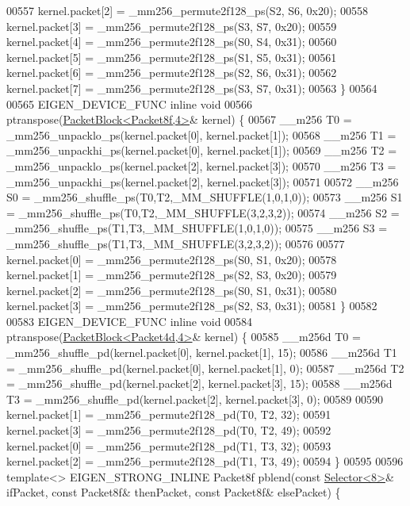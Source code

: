 \begin{DoxyCode}
{{00557   kernel.packet[2] = \_mm256\_permute2f128\_ps(S2, S6, 0x20);
00558   kernel.packet[3] = \_mm256\_permute2f128\_ps(S3, S7, 0x20);
00559   kernel.packet[4] = \_mm256\_permute2f128\_ps(S0, S4, 0x31);
00560   kernel.packet[5] = \_mm256\_permute2f128\_ps(S1, S5, 0x31);
00561   kernel.packet[6] = \_mm256\_permute2f128\_ps(S2, S6, 0x31);
00562   kernel.packet[7] = \_mm256\_permute2f128\_ps(S3, S7, 0x31);
00563 \}
00564 
00565 EIGEN\_DEVICE\_FUNC \textcolor{keyword}{inline} \textcolor{keywordtype}{void}
00566 ptranspose(\hyperlink{struct_eigen_1_1internal_1_1_packet_block}{PacketBlock<Packet8f,4>}& kernel) \{
00567   \_\_m256 T0 = \_mm256\_unpacklo\_ps(kernel.packet[0], kernel.packet[1]);
00568   \_\_m256 T1 = \_mm256\_unpackhi\_ps(kernel.packet[0], kernel.packet[1]);
00569   \_\_m256 T2 = \_mm256\_unpacklo\_ps(kernel.packet[2], kernel.packet[3]);
00570   \_\_m256 T3 = \_mm256\_unpackhi\_ps(kernel.packet[2], kernel.packet[3]);
00571 
00572   \_\_m256 S0 = \_mm256\_shuffle\_ps(T0,T2,\_MM\_SHUFFLE(1,0,1,0));
00573   \_\_m256 S1 = \_mm256\_shuffle\_ps(T0,T2,\_MM\_SHUFFLE(3,2,3,2));
00574   \_\_m256 S2 = \_mm256\_shuffle\_ps(T1,T3,\_MM\_SHUFFLE(1,0,1,0));
00575   \_\_m256 S3 = \_mm256\_shuffle\_ps(T1,T3,\_MM\_SHUFFLE(3,2,3,2));
00576 
00577   kernel.packet[0] = \_mm256\_permute2f128\_ps(S0, S1, 0x20);
00578   kernel.packet[1] = \_mm256\_permute2f128\_ps(S2, S3, 0x20);
00579   kernel.packet[2] = \_mm256\_permute2f128\_ps(S0, S1, 0x31);
00580   kernel.packet[3] = \_mm256\_permute2f128\_ps(S2, S3, 0x31);
00581 \}
00582 
00583 EIGEN\_DEVICE\_FUNC \textcolor{keyword}{inline} \textcolor{keywordtype}{void}
00584 ptranspose(\hyperlink{struct_eigen_1_1internal_1_1_packet_block}{PacketBlock<Packet4d,4>}& kernel) \{
00585   \_\_m256d T0 = \_mm256\_shuffle\_pd(kernel.packet[0], kernel.packet[1], 15);
00586   \_\_m256d T1 = \_mm256\_shuffle\_pd(kernel.packet[0], kernel.packet[1], 0);
00587   \_\_m256d T2 = \_mm256\_shuffle\_pd(kernel.packet[2], kernel.packet[3], 15);
00588   \_\_m256d T3 = \_mm256\_shuffle\_pd(kernel.packet[2], kernel.packet[3], 0);
00589 
00590   kernel.packet[1] = \_mm256\_permute2f128\_pd(T0, T2, 32);
00591   kernel.packet[3] = \_mm256\_permute2f128\_pd(T0, T2, 49);
00592   kernel.packet[0] = \_mm256\_permute2f128\_pd(T1, T3, 32);
00593   kernel.packet[2] = \_mm256\_permute2f128\_pd(T1, T3, 49);
00594 \}
00595 
00596 \textcolor{keyword}{template}<> EIGEN\_STRONG\_INLINE Packet8f pblend(\textcolor{keyword}{const} \hyperlink{struct_eigen_1_1internal_1_1_selector}{Selector<8>}& ifPacket, \textcolor{keyword}{const} Packet8f& 
      thenPacket, \textcolor{keyword}{const} Packet8f& elsePacket) \{
}}
\end{DoxyCode}
